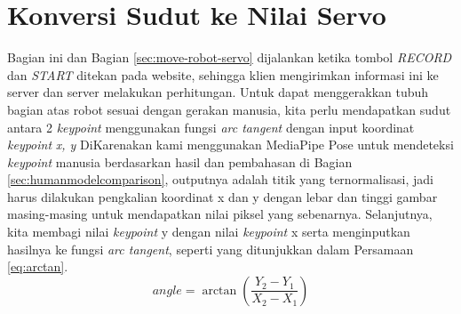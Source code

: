\section{Konversi Sudut ke Nilai Servo}
\label{sec:convert-angle-to-servo-value}

Bagian ini dan Bagian \ref{sec:move-robot-servo} dijalankan ketika tombol \textit{RECORD} dan \textit{START} ditekan pada website, sehingga klien mengirimkan informasi ini ke server dan server melakukan perhitungan.
Untuk dapat menggerakkan tubuh bagian atas robot sesuai dengan gerakan manusia, kita perlu mendapatkan sudut antara 2 \textit{keypoint} menggunakan fungsi \emph{arc tangent} dengan input koordinat \textit{keypoint} \emph{{x, y}}
DiKarenakan kami menggunakan MediaPipe Pose untuk mendeteksi \textit{keypoint} manusia berdasarkan hasil dan pembahasan di Bagian \ref{sec:humanmodelcomparison}, outputnya adalah titik yang ternormalisasi, jadi harus dilakukan pengkalian koordinat x dan y dengan lebar dan tinggi gambar masing-masing untuk mendapatkan nilai piksel yang sebenarnya.
Selanjutnya, kita membagi nilai \textit{keypoint} y dengan nilai \textit{keypoint} x serta menginputkan hasilnya ke fungsi \emph{arc tangent}, seperti yang ditunjukkan dalam Persamaan \ref{eq:arctan}.
\begin{equation}
  \label{eq:arctan}
  angle = \arctan \left(\frac{Y_2 - Y_1}{X_2 - X_1}\right)
\end{equation}

